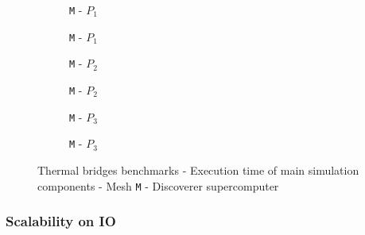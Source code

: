 {\begin{figure}
    \begin{subfigure}[c]{0.49\textwidth}
      \centering
      \caption{\texttt{M\meshId} - \texttt{$P_1$}}
    \end{subfigure}
    \hfill
    \begin{subfigure}[c]{0.49\textwidth}
      \centering
      \caption{\texttt{M\meshId} - \texttt{$P_1$}}
    \end{subfigure}
    \hfill
    \vspace*{0.04\textwidth}
    \begin{subfigure}[c]{0.49\textwidth}
      \centering
      \caption{\texttt{M\meshId} - \texttt{$P_2$}}
    \end{subfigure}
    \hfill
    \begin{subfigure}[c]{0.49\textwidth}
      \centering
      \caption{\texttt{M\meshId} - \texttt{$P_2$}}
    \end{subfigure}
    \hfill
    \vspace*{0.04\textwidth}
    \begin{subfigure}[c]{0.49\textwidth}
      \centering
      \caption{\texttt{M\meshId} - \texttt{$P_3$}}
    \end{subfigure}
    \hfill
    \begin{subfigure}[c]{0.49\textwidth}
      \centering
      \caption{\texttt{M\meshId} - \texttt{$P_3$}}
    \end{subfigure}
    \caption{Thermal bridges benchmarks - Execution time of main simulation components
      - Mesh \texttt{M\meshId} - Discoverer supercomputer}
    \label{fig:spec:app-feelpp-discr-1:thermal_bridges:performance_times_M\meshId}
  \end{figure}
}

\subsubsection{Scalability on IO}


